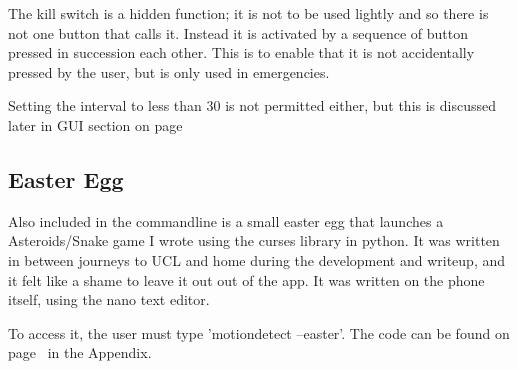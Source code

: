 The kill switch is a hidden function; it is not to be used lightly and so there is not one button that calls it. Instead it is activated by a sequence of button pressed in succession each other. This is to enable that it is not accidentally pressed by the user, but is only used in emergencies.

Setting the interval to less than 30 is not permitted either, but this is discussed later in GUI section on page~\pageref{gui}

\subsection{Easter Egg}
Also included in the commandline is a small easter egg that launches a Asteroids/Snake game I wrote using the curses library in python. It was written in between journeys to UCL and home during the development and writeup, and it felt like a shame to leave it out out of the app.
It was written on the phone itself, using the nano text editor.

To access it, the user must type 'motiondetect --easter'. The code can be found on page~\pageref{easter} in the Appendix.

%
